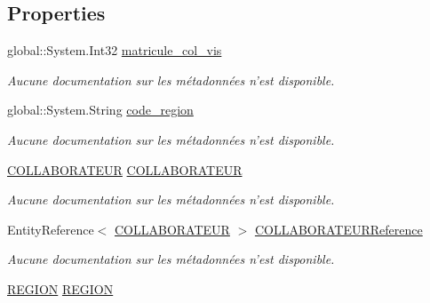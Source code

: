 \subsection*{Properties}
\begin{DoxyCompactItemize}
\item 
global\-::\-System.\-Int32 \hyperlink{class_model_1_1_v_i_s_i_t_e_u_r_a8fe524ed5e9ea7a4fa823fbf14798843}{matricule\-\_\-col\-\_\-vis}
\begin{DoxyCompactList}\small\item\em Aucune documentation sur les métadonnées n'est disponible. \end{DoxyCompactList}\item 
global\-::\-System.\-String \hyperlink{class_model_1_1_v_i_s_i_t_e_u_r_ac9237709a2b9919c19430af4c307d647}{code\-\_\-region}
\begin{DoxyCompactList}\small\item\em Aucune documentation sur les métadonnées n'est disponible. \end{DoxyCompactList}\item 
\hyperlink{class_model_1_1_c_o_l_l_a_b_o_r_a_t_e_u_r}{C\-O\-L\-L\-A\-B\-O\-R\-A\-T\-E\-U\-R} \hyperlink{class_model_1_1_v_i_s_i_t_e_u_r_adc7d97aca9f5c1f8438ac6921d6e199f}{C\-O\-L\-L\-A\-B\-O\-R\-A\-T\-E\-U\-R}
\begin{DoxyCompactList}\small\item\em Aucune documentation sur les métadonnées n'est disponible. \end{DoxyCompactList}\item 
Entity\-Reference$<$ \hyperlink{class_model_1_1_c_o_l_l_a_b_o_r_a_t_e_u_r}{C\-O\-L\-L\-A\-B\-O\-R\-A\-T\-E\-U\-R} $>$ \hyperlink{class_model_1_1_v_i_s_i_t_e_u_r_a03a81c47bc545b4ae4dac5334ed8b291}{C\-O\-L\-L\-A\-B\-O\-R\-A\-T\-E\-U\-R\-Reference}
\begin{DoxyCompactList}\small\item\em Aucune documentation sur les métadonnées n'est disponible. \end{DoxyCompactList}\item 
\hyperlink{class_model_1_1_r_e_g_i_o_n}{R\-E\-G\-I\-O\-N} \hyperlink{class_model_1_1_v_i_s_i_t_e_u_r_aea8d4f38b234f007d096b34d41537e07}{R\-E\-G\-I\-O\-N}

\end{DoxyCompactItemize}
